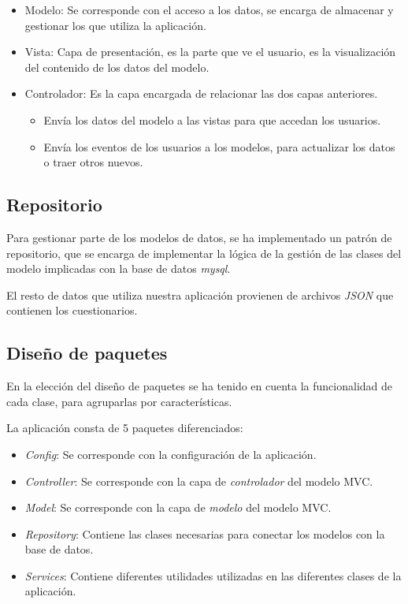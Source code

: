 \begin{itemize}
	\item Modelo: Se corresponde con el acceso a los datos, se encarga de almacenar y gestionar los que utiliza la aplicación.
	\item Vista: Capa de presentación, es la parte que ve el usuario, es la visualización del contenido de los datos del modelo.
	\item Controlador: Es la capa encargada de relacionar las dos capas anteriores. 
	\begin{itemize}
		\item Envía los datos del modelo a las vistas para que accedan los usuarios.
		\item Envía los eventos de los usuarios a los modelos, para actualizar los datos o traer otros nuevos.
	\end{itemize}
\end{itemize}


\subsection{Repositorio}

Para gestionar parte de los modelos de datos, se ha implementado un patrón de repositorio, que se encarga de implementar la lógica de la gestión de las clases del modelo implicadas con la base de datos \textit{mysql}.

El resto de datos que utiliza nuestra aplicación provienen de archivos \textit{JSON} que contienen los cuestionarios.

\subsection{Diseño de paquetes}

En la elección del diseño de paquetes se ha tenido en cuenta la funcionalidad de cada clase, para agruparlas por características.

La aplicación consta de 5 paquetes diferenciados:

\begin{itemize}
	\item \textit{Config}: Se corresponde con la configuración de la aplicación.
	\item \textit{Controller}: Se corresponde con la capa de \textit{controlador} del modelo MVC.
	\item \textit{Model}: Se corresponde con la capa de \textit{modelo} del modelo MVC.
	\item \textit{Repository}: Contiene las clases necesarias para conectar los modelos con la base de datos.
	\item \textit{Services}: Contiene diferentes utilidades utilizadas en las diferentes clases de la aplicación.
\end{itemize}

